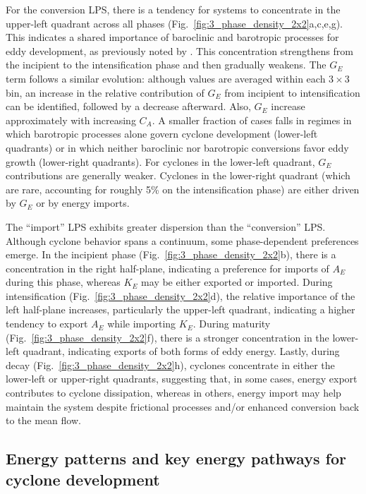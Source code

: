 \documentclass[pdflatex,sn-chicago]{sn-jnl}%
\theoremstyle{plain}
\theoremstyle{definition}
\theoremstyle{remark}
\theoremstyle{definition}
\begin{document}
For the conversion LPS, there is a tendency for systems to concentrate in the upper-left quadrant across all phases (Fig.~\ref{fig:3_phase_density_2x2}a,c,e,g). This indicates a shared importance of baroclinic and barotropic processes for eddy development, as previously noted by \citet{de2025lorenz}. This concentration strengthens from the incipient to the intensification phase and then gradually weakens. The $G_E$ term follows a similar evolution: although values are averaged within each $3 \times 3$ bin, an increase in the relative contribution of $G_E$ from incipient to intensification can be identified, followed by a decrease afterward. Also, $G_E$ increase approximately with increasing $C_A$. A smaller fraction of cases falls in regimes in which barotropic processes alone govern cyclone development (lower-left quadrants) or in which neither baroclinic nor barotropic conversions favor eddy growth (lower-right quadrants). For cyclones in the lower-left quadrant, $G_E$ contributions are generally weaker. Cyclones in the lower-right quadrant (which are rare, accounting for roughly 5\% on the intensification phase) are either driven by $G_E$ or by energy imports.

The ``import'' LPS exhibits greater dispersion than the ``conversion'' LPS. Although cyclone behavior spans a continuum, some phase-dependent preferences emerge. In the incipient phase (Fig.~\ref{fig:3_phase_density_2x2}b), there is a concentration in the right half-plane, indicating a preference for imports of $A_E$ during this phase, whereas $K_E$ may be either exported or imported. During intensification (Fig.~\ref{fig:3_phase_density_2x2}d), the relative importance of the left half-plane increases, particularly the upper-left quadrant, indicating a higher tendency to export $A_E$ while importing $K_E$. During maturity (Fig.~\ref{fig:3_phase_density_2x2}f), there is a stronger concentration in the lower-left quadrant, indicating exports of both forms of eddy energy. Lastly, during decay (Fig.~\ref{fig:3_phase_density_2x2}h), cyclones concentrate in either the lower-left or upper-right quadrants, suggesting that, in some cases, energy export contributes to cyclone dissipation, whereas in others, energy import may help maintain the system despite frictional processes \citep{de2025lorenz} and/or enhanced conversion back to the mean flow.


\subsection{Energy patterns and key energy pathways for cyclone development}
\label{sec:energy_patterns}
\end{document}
